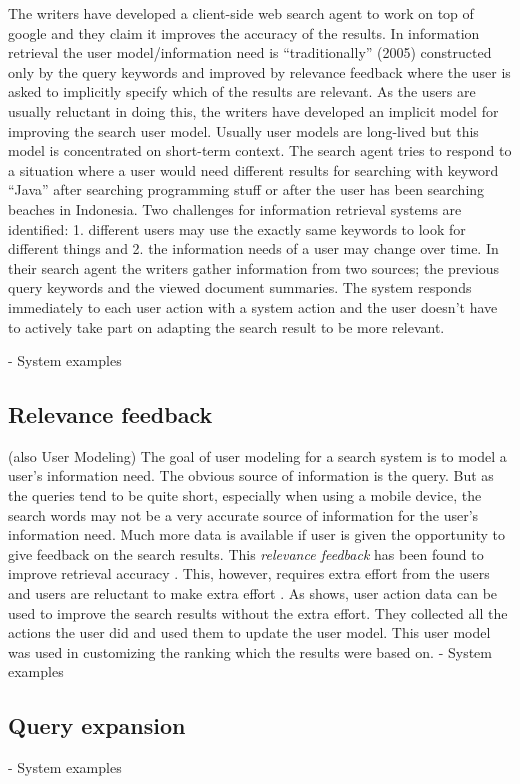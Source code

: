 \documentclass{sigchi}
\begin{document}
\cite{shen05}The writers have developed a client-side web search agent to work on top of google and they claim it improves the accuracy of the results. In information retrieval the user model/information need is “traditionally” (2005) constructed only by the query keywords and improved by relevance feedback where the user is asked to implicitly specify which of the results are relevant. As the users are usually reluctant in doing this, the writers have developed an implicit model for improving the search user model. Usually user models are long-lived but this model is concentrated on short-term context. The search agent tries to respond to a situation where a user would need different results for searching with keyword “Java” after searching programming stuff or after the user has been searching beaches in Indonesia. Two challenges for information retrieval systems are identified: 1. different users may use the exactly same keywords to look for different things and 2. the information needs of a user may change over time. In their search agent the writers gather information from two sources; the previous query keywords and the viewed document summaries. The system responds immediately to each user action with a system action and the user doesn’t have to actively take part on adapting the search result to be more relevant.

- System examples
\subsection{Relevance feedback}
(also User Modeling) The goal of user modeling for a search system is to model a user's information need. The obvious source of information is the query. But as the queries tend to be quite short, especially when using a mobile device, the search words may not be a very accurate source of information for the user's information need. Much more data is available if user is given the opportunity to give feedback on the search results. This \emph{relevance feedback} has been found to improve retrieval accuracy \cite{salton90}. This, however, requires extra effort from the users and users are reluctant to make extra effort \cite{kelly03}. As \cite{shen05} shows, user action data can be used to improve the search results without the extra effort. They collected all the actions the user did and used them to update the user model. This user model was used in customizing the ranking which the results were based on.
- System examples
\subsection{Query expansion}
- System examples
\end{document}
